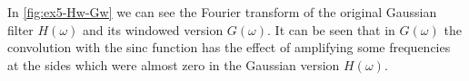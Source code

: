 \documentclass[tikz,14pt,fleqn]{article}
\begin{document}
In \autoref{fig:ex5-Hw-Gw} we can see the Fourier transform of the original Gaussian filter $H(\omega)$ and its windowed version $G(\omega)$. It can be seen that in $G(\omega)$ the convolution with the sinc function has the effect of amplifying some frequencies at the sides which were almost zero in the Gaussian version $H(\omega)$.
\end{document}
